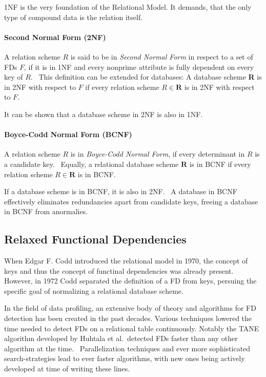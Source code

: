 1NF is the very foundation of the Relational Model. It demands, that the only type of compound data is the relation itself.~\cite[p.~6]{COD90}

\paragraph{Second Normal Form (2NF)} A relation scheme \(R\) is said to be in \emph{Second Normal Form} in respect to a set of FDs \(F\), if it is in 1NF and every nonprime attribute is fully dependent on every key of \(R\).~\cite[p.~99]{MAI83}
This definition can be extended for databases: A database scheme \textbf{R} is in 2NF with respect to \(F\) if every relation scheme \(R \in \textbf{R} \) is in 2NF with respect to \(F\).

It can be shown that a database scheme in 2NF is also in 1NF.~\cite[p.~58]{SCH17}

\paragraph{Boyce-Codd Normal Form (BCNF)}
A relation scheme \( R \) is in \emph{Boyce-Codd Normal Form}, if every determinant in \( R \) is a candidate key.~\cite[p.~65]{SCH17}
Equally, a relational database scheme \( \textbf{R} \) is in BCNF if every relation scheme \( R \in \textbf{R} \) is in BCNF.\

If a database scheme is in BCNF, it is also in 2NF.~\cite[p.~58]{SCH17} A database in BCNF effectively eliminates redundancies apart from candidate keys, freeing a database in BCNF from anormalies.~\cite[p.~67]{SCH17}


\subsection{Relaxed Functional Dependencies}
When Edgar F. Codd introduced the relational model in 1970, the concept of keys and thus the concept of functinal dependencies was already present.\cite[p.~70]{MAI83}
However, in 1972 Codd separated the definition of a FD from keys, persuing the specific goal of normalizing a relational database scheme.

In the field of data profiling, an extensive body of theory and algorithms for FD detection has been created in the past decades.
Various techniques lowered the time needed to detect FDs on a relational table continuously.
Notably the TANE algorithm developed by Huhtala et al.\ detected FDs faster than any other algorithm at the time.~\cite{HUH99}
Parallelization techniques and ever more sophisticated search-strategies lead to ever faster algorithms, with new ones being actively developed at time of writing these lines.~\cite[p.~1]{PAP15}


